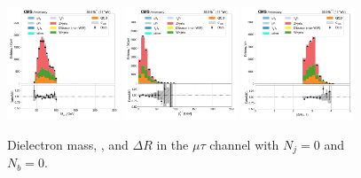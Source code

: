 \begin{figure}[htb!]
    \centering
    \includegraphics[width=0.3\textwidth]{chapters/Analysis/sectionPlots/figures/data_mc_overlays/mutau_2016_cat_eq1_eq0_signal_linear_lepton_dilepton1_mass}
    \includegraphics[width=0.3\textwidth]{chapters/Analysis/sectionPlots/figures/data_mc_overlays/mutau_2016_cat_eq1_eq0_signal_linear_lepton_dilepton1_pt}
    \includegraphics[width=0.3\textwidth]{chapters/Analysis/sectionPlots/figures/data_mc_overlays/mutau_2016_cat_eq1_eq0_signal_linear_lepton_dilepton1_delta_r}
    \caption{Dielectron mass, \pt, and $\Delta R$ in the $\mu\tau$ channel
    with $N_{j} = 0$ and $N_{b} = 0$.}
    \label{fig:analysis:plots:mutau_2_dilepton}
\end{figure}

